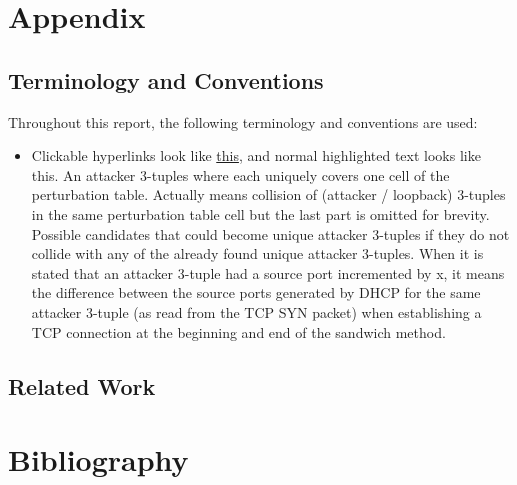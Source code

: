\documentclass{report}
\begin{document}
\chapter{Appendix}
\label{sec:appendix}

\section{Terminology and Conventions}
\label{sec:terminology and conventions}

Throughout this report, the following terminology and conventions are used:
\begin{itemize}
	\item Clickable hyperlinks look like \hyperref[sec:terminology and conventions]{this}, and normal highlighted text looks like \alert{this}.
	 An attacker 3-tuples where each uniquely covers one cell of the perturbation table.
	 Actually means collision of (attacker / loopback) 3-tuples in the same perturbation table cell but the last part is omitted for brevity.
	 Possible candidates that could become unique attacker 3-tuples if they do not collide with any of the already found unique attacker 3-tuples.
	 When it is stated that an attacker 3-tuple had a source port incremented by x, it means the difference between the source ports generated by DHCP for the same attacker 3-tuple (as read from the TCP SYN packet) when establishing a TCP connection at the beginning and end of the sandwich method.
\end{itemize}

\section{Related Work}
\label{sec:related work}

\vspace{0.5cm}
\chapter{Bibliography}
\label{sec:bibliography}

\printbibliography[heading=none]

\end{document}
